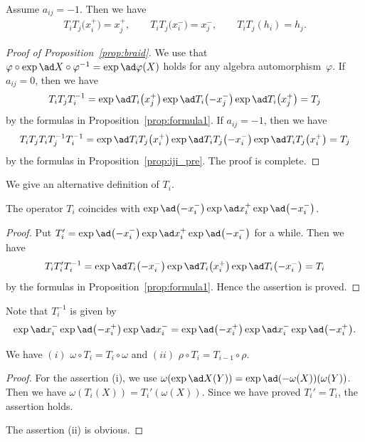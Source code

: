 \begin{prop}\label{prop:iji_pre}Assume $a_{ij}=-1$. Then we have
\begin{gather*}
T_i T_j \big(x_i^+\big) = x_j^+,\qquad T_i T_j \big(x_i^-\big) = x_j^-,\qquad T_i T_j (h_i) = h_j.
\end{gather*}
\end{prop}

\begin{proof}[Proof of Proposition~\ref{prop:braid}] We use that $\varphi \circ \exp\ad X \circ \varphi^{-1} = \exp \ad \varphi(X)$ holds for any algebra automorphism~$\varphi$. If $a_{ij}=0$, then we have
\begin{gather*}
T_i T_j T_i^{-1} = \exp\ad T_i\big(x_j^+\big) \exp\ad T_i\big({-}x_j^-\big) \exp\ad T_i\big(x_j^+\big) = T_j
\end{gather*}
by the formulas in Proposition~\ref{prop:formula1}. If $a_{ij}=-1$, then we have
\begin{gather*}
T_i T_j T_i T_j^{-1} T_i^{-1} = \exp\ad T_i T_j \big(x_i^+\big) \exp\ad T_i T_j \big({-}x_i^-\big) \exp\ad T_i T_j \big(x_i^+\big) = T_j
\end{gather*}
by the formulas in Proposition~\ref{prop:iji_pre}. The proof is complete.
\end{proof}

We give an alternative definition of $T_i$.
\begin{prop}The operator $T_i$ coincides with $\exp\ad \big({-}x_i^{-}\big) \exp\ad x_i^{+} \exp\ad \big({-}x_i^{-}\big)$.
\end{prop}
\begin{proof}Put $T_i' = \exp\ad \big({-}x_i^{-}\big) \exp\ad x_i^{+} \exp\ad \big({-}x_i^{-}\big)$ for a while. Then we have
\begin{gather*}
T_i T_i' T_i^{-1} = \exp\ad T_i\big({-}x_i^{-}\big) \exp\ad T_i\big(x_i^+\big) \exp\ad T_i\big({-}x_i^{-}\big) = T_i
\end{gather*}
by the formulas in Proposition~\ref{prop:formula1}. Hence the assertion is proved.
\end{proof}

Note that $T_i^{-1}$ is given by
\begin{gather*}
\exp\ad x_i^- \exp\ad \big({-}x_i^+\big) \exp\ad x_i^- = \exp\ad \big({-}x_i^+\big) \exp\ad x_i^- \exp\ad \big({-}x_i^+\big).
\end{gather*}

\begin{lem}\label{lem:rho_omega_and_T} We have $(i)$ $\omega \circ T_i = T_{i} \circ \omega$ and $(ii)$ $\rho \circ T_i = T_{i-1} \circ \rho$.
\end{lem}
\begin{proof}For the assertion (i), we use $\omega (\exp\ad X (Y)) = \exp\ad(-\omega(X))(\omega(Y))$. Then we have $\omega(T_i(X))=T_i'(\omega(X))$. Since we have proved $T_i'=T_i$, the assertion holds.

The assertion (ii) is obvious.
\end{proof}

